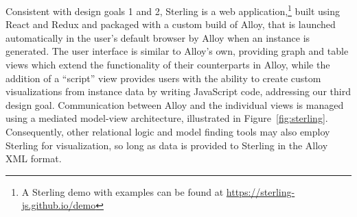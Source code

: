\documentclass[runningheads]{llncs}
\begin{document}
Consistent with design goals 1 and 2, Sterling is a web application,\footnote{A Sterling demo with examples can be found at \href{https://sterling-js.github.io/demo}{https://sterling-js.github.io/demo}} built using React and Redux and packaged with a custom build of Alloy, that is launched automatically in the user's default browser by Alloy when an instance is generated. 
The user interface is similar to Alloy's own, providing graph and table views which extend the functionality of their counterparts in Alloy, while the addition of a ``script'' view provides users with the ability to create custom visualizations from instance data by writing JavaScript code, addressing our third design goal.
Communication between Alloy and the individual views is managed using a mediated model-view architecture, illustrated in Figure~\ref{fig:sterling}. Consequently, other relational logic and model finding tools may also employ Sterling for visualization, so long as data is provided to Sterling in the Alloy XML format.
\end{document}
